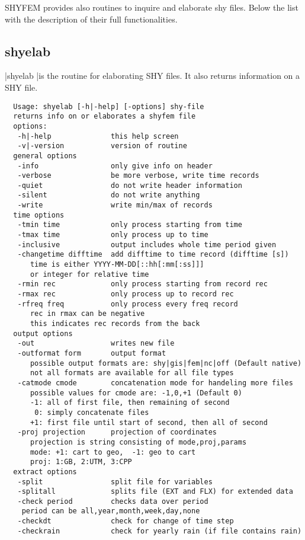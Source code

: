 
SHYFEM provides also routines to inquire and elaborate shy files. Below the list with the description of their full
functionalities.
\subsection{shyelab}
|shyelab |is the routine for elaborating SHY files. It also returns
information on a SHY file.

\begin{verbatim}
  Usage: shyelab [-h|-help] [-options] shy-file
  returns info on or elaborates a shyfem file
  options:
   -h|-help              this help screen
   -v|-version           version of routine
  general options
   -info                 only give info on header
   -verbose              be more verbose, write time records
   -quiet                do not write header information
   -silent               do not write anything
   -write                write min/max of records
  time options
   -tmin time            only process starting from time
   -tmax time            only process up to time
   -inclusive            output includes whole time period given
   -changetime difftime  add difftime to time record (difftime [s])
      time is either YYYY-MM-DD[::hh[:mm[:ss]]]
      or integer for relative time
   -rmin rec             only process starting from record rec
   -rmax rec             only process up to record rec
   -rfreq freq           only process every freq record
      rec in rmax can be negative
      this indicates rec records from the back
  output options
   -out                  writes new file
   -outformat form       output format
      possible output formats are: shy|gis|fem|nc|off (Default native)
      not all formats are available for all file types
   -catmode cmode        concatenation mode for handeling more files
      possible values for cmode are: -1,0,+1 (Default 0)
      -1: all of first file, then remaining of second
       0: simply concatenate files
      +1: first file until start of second, then all of second
   -proj projection      projection of coordinates
      projection is string consisting of mode,proj,params
      mode: +1: cart to geo,  -1: geo to cart
      proj: 1:GB, 2:UTM, 3:CPP
  extract options
   -split                split file for variables
   -splitall             splits file (EXT and FLX) for extended data
   -check period         checks data over period
    period can be all,year,month,week,day,none
   -checkdt              check for change of time step
   -checkrain            check for yearly rain (if file contains rain)

\end{verbatim}
